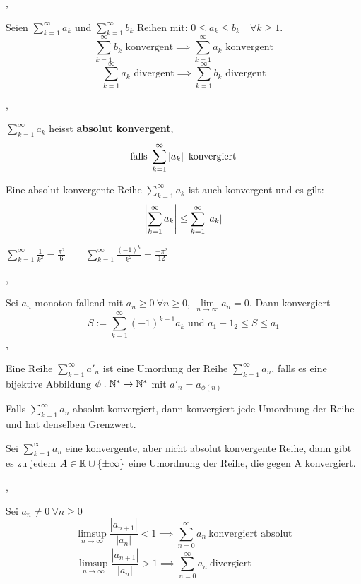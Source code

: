 \sep

\Korollar[2.7.7 (Vergleichssatz)] Seien $\sum_{k=1}^{\infty} a_{k}$ und $\sum_{k=1}^{\infty} b_{k}$ Reihen mit: $0 \leq a_{k} \leq b_{k} \quad \forall k \geq 1. $
\[ \sum_{k=1}^{\infty} b_{k} \text{ konvergent} \implies \sum_{k=1}^{\infty} a_{k} \text{ konvergent} \]
\[ \sum_{k=1}^{\infty} a_{k} \text{ divergent} \implies \sum_{k=1}^{\infty} b_{k} \text{ divergent} \]

\sep

\Satz[2.7.9] $\sum_{k=1}^{\infty} a_{k}$ heisst \textbf{absolut konvergent}, 
\[ \text{falls } \sum_{k=1}^{\infty} \left\lvert a_{k} \right\rvert \text{ konvergiert} \]

\Satz[2.7.10] Eine absolut konvergente Reihe $\sum_{k=1}^{\infty} a_{k}$ ist auch konvergent und es gilt:
\[ \left\lvert \sum_{k=1}^{\infty} a_{k} \right\rvert \leq \sum_{k=1}^{\infty} \left\lvert a_{k} \right\rvert\]

\Bsp $\sum_{k=1}^{\infty} \frac{1}{k^2} = \frac{\pi^2}{6} \quad \quad \sum_{k=1}^{\infty} \frac{(-1)^k}{k^2} = \frac{-\pi^2}{12}$ 
 
\sep

\Satz[2.7.12 Leibniz] Sei $a_{n}$ monoton fallend mit $a_{n} \geq 0 \ \forall n \geq 0, \ \lim\limits_{n \rightarrow \infty} a_{n} = 0.$ Dann konvergiert
\[ S :=  \sum_{k=1}^{\infty} (-1)^{k+1} a_{k} \text{ und } a_{1} - 1_{2} \leq S \leq {a_1} \]
\sep

\Def[2.7.14] Eine Reihe  $\sum_{k=1}^{\infty} a'_{n}$ ist eine Umordung der Reihe  $\sum_{k=1}^{\infty} a_{n}$, falls es eine bijektive Abbildung $\phi : \mathbb{N}^{*} \rightarrow \mathbb{N}^{*}$ mit $a'_{n} = a_{\phi(n)}$ 

\Satz[2.7.16 Dirichlet] Falls $\sum_{k=1}^{\infty} a_{n}$ absolut konvergiert, dann konvergiert jede Umordnung der Reihe und hat denselben Grenzwert.  

\Satz[Riemann] Sei $\sum_{k=1}^{\infty} a_{n}$ eine konvergente, aber nicht absolut konvergente Reihe, dann gibt es zu jedem $A \in \mathbb{R} \cup \{\pm \infty\}$ eine Umordnung der Reihe, die gegen A konvergiert. 

\sep

\Satz[Quotientenkriterium] Sei $a_{n} \neq 0 \ \forall n \geq 0$
\[\limsup\limits_{n \rightarrow \infty} \frac{\left|a_{n+1}\right|}{\left|a_{n}\right|}<1 \implies \sum_{n=0}^{\infty} a_{n} \ \text{konvergiert absolut}\]
\[\limsup\limits_{n \rightarrow \infty} \frac{\left|a_{n+1}\right|}{\left|a_{n}\right|}>1 \implies \sum_{n=0}^{\infty} a_{n} \ \text{divergiert} \quad \quad \quad \quad\]

